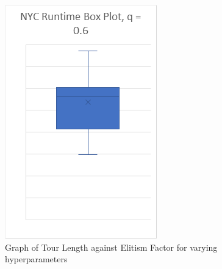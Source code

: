 \documentclass[sigconf]{acmart}
\begin{document}
\begin{figure}[h]
  \centering
  \includegraphics[width=\linewidth]{genetic_box_NYC.png}
  \caption{Graph of Tour Length against Elitism Factor for varying hyperparameters}
\end{figure}

\end{document}
